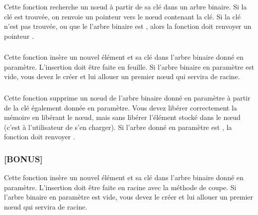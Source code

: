 \subsubsection*{}

\noindent Cette fonction recherche un nœud à partir de sa clé dans un arbre binaire.
Si la clé est trouvée, on renvoie un pointeur vers le nœud contenant la clé.
Si la clé n'est pas trouvée, ou que le l'arbre binaire est , alors la fonction doit renvoyer un pointeur .

\bigskip


\subsubsection*{}

\noindent Cette fonction insère un nouvel élément et sa clé dans l'arbre binaire donné en paramètre.
L'insertion doit être faite en feuille.
Si l'arbre binaire en paramètre est vide, vous devez le créer et lui allouer un premier nœud qui servira de racine.

\bigskip


\subsubsection*{}

\noindent Cette fonction supprime un nœud de l'arbre binaire donné en paramètre à partir de la clé également donnée en paramètre.
Vous devez libérer correctement la mémoire en libérant le nœud, mais sans libérer l'élément stocké dans le nœud (c'est à l'utilisateur de s'en charger).
Si l'arbre donné en paramètre est , la fonction doit renvoyer .

\bigskip


\subsubsection*{\textbf{[BONUS] }}

\noindent Cette fonction insère un nouvel élément et sa clé dans l'arbre binaire donné en paramètre.
L'insertion doit être faite en racine avec la méthode de coupe.
Si l'arbre binaire en paramètre est vide, vous devez le créer et lui allouer un premier nœud qui servira de racine.
